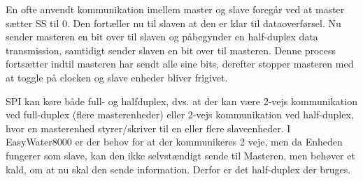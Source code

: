 En ofte anvendt kommunikation imellem master og slave foregår ved at master sætter SS til 0. Den fortæller nu til slaven at den er klar til 
dataoverførsel. Nu sender masteren en bit over til slaven og påbegynder en half-duplex data transmission, samtidigt sender slaven en bit over til masteren. Denne process fortsætter indtil masteren har sendt alle sine bits, derefter stopper masteren med at toggle på clocken og slave enheder bliver frigivet.

SPI kan køre både full- og halfduplex, dvs. at der kan være 2-vejs kommunikation ved full-duplex (flere masterenheder) eller 2-vejs kommunikation ved half-duplex, hvor en masterenhed styrer/skriver til en eller flere slaveenheder. I EasyWater8000 er der behov for at der kommunikeres 2 veje, men da Enheden fungerer som slave, kan den ikke selvstændigt sende til Masteren, men behøver et kald, om at nu skal den sende information. Derfor er det half-duplex der bruges.